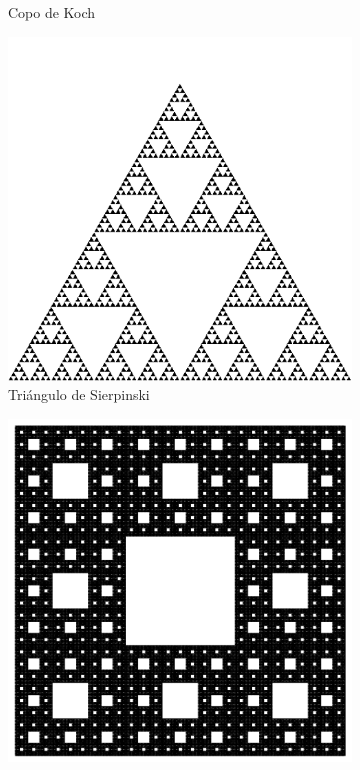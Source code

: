 \begin{frame}{\insertsectionhead}
\begin{figure}[ht!]
\begin{subfigure}[b]{0.2\textwidth}
      \caption*{Copo de Koch}
    \end{subfigure}
    \hspace{\fill}
    \begin{subfigure}[b]{0.23\textwidth}
      \includegraphics[width=\textwidth]{screenshots/Sierpinski.png}
      \caption*{Triángulo de Sierpinski}
    \end{subfigure}
     \hspace{\fill}
    \begin{subfigure}[b]{0.23\textwidth}
      \includegraphics[width=\textwidth]{screenshots/alfombra.png}

\end{subfigure}
\end{figure}
\end{frame}
